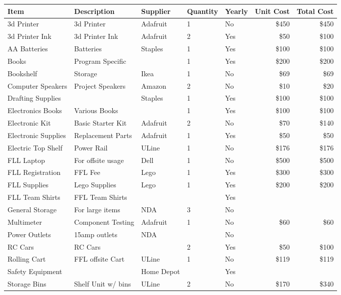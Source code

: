 \documentclass{article}
\begin{document}
\begin{table}[bh]
\begin{tabular}{ lp{3cm}lllrr }
Item & Description & Supplier & Quantity & Yearly & Unit Cost & Total Cost \\
\hline
3d Printer & 3d Printer & Adafruit& 1 & No & \$450 & \$450 \\
3d Printer Ink & 3d Printer Ink  & Adafruit   & 2  & Yes & \$50 &  \$100 \\  
AA Batteries &   Batteries &  Staples & 1 &  Yes & \$100  &  \$100 \\   
Books  & Program Specific  &    & 1 &  Yes & \$200  &  \$200    \\
Bookshelf  & Storage &  Ikea  &  1 &  No  & \$69 & \$69 \\
Computer Speakers &  Project Speakers &  Amazon&  2 &  No & \$10 & \$20 \\
Drafting Supplies  &  &  Staples & 1 &   Yes & \$100 &   \$100  \\  
Electronics Books &  Various Books  & &    1 &  Yes & \$100 &   \$100    \\
Electronic Kit&  Basic Starter Kit &  Adafruit  &  2 &  No & \$70 & \$140  \\
Electronic Supplies& Replacement Parts &  Adafruit &   1 &  Yes& \$50 & \$50 \\
Electric Top Shelf & Power Rail& ULine &  1  & No & \$176 &   \$176  \\
FLL Laptop & For offsite usage &Dell  &  1&  No  & \$500 &   \$500    \\
FLL Registration  &  FFL Fee  &Lego  &  1 &  Yes & \$300   & \$300  \\  
FLL Supplies &   Lego Supplies  & Lego   & 1  & Yes & \$200  &  \$200    \\
FLL Team Shirts& FFL Team Shirts &      &&    Yes         \\
General Storage& For large items&NDA&3 &  No          \\
Multimeter & Component Testing & Adafruit  &  1 &  No & \$60 & \$60 \\
Power Outlets &  15amp outlets&    NDA &  &  No          \\
RC Cars& RC Cars&    &    2   &Yes& \$50 & \$100    \\
Rolling Cart   & FFL offsite Cart &  ULine  & 1 &  No & \$119  &  \$119    \\
Safety Equipment &   & Home Depot   & &  Yes         \\
Storage Bins   & Shelf Unit w/ bins  &  ULine  & 2 &  No & \$170  &  \$340    \\

\end{tabular}
\end{table}
\end{document}
